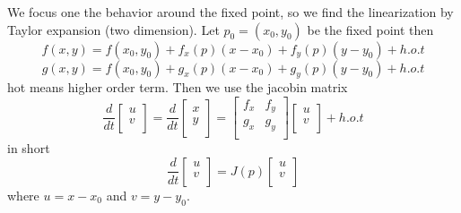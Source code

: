 \documentclass[9pt]{article}
\theoremstyle{definition}
\newcommand{\newmatrix}[2]{\left[
                            \begin{matrix}
                            	{#1}\\
                            	{#2}\\
                            \end{matrix}
                           \right]}
\newenvironment{changemargin}[2]{%
  \begin{list}{}{%
    \setlength{\topsep}{0pt}%
    \setlength{\leftmargin}{#1}%
    \setlength{\rightmargin}{#2}%
    \setlength{\listparindent}{\parindent}%
    \setlength{\itemindent}{\parindent}%
    \setlength{\parsep}{\parskip}%
  }%
  \item[]}{\end{list}}
\theoremstyle{theorem}
\theoremstyle{remark}
\theoremstyle{lemma}
\begin{document}
\begin{changemargin}{-0.125in}{0in}
\begin{enumerate}
\begin{enumerate}
        We focus one the behavior around the fixed point, so we find the linearization by Taylor expansion (two dimension). Let $p_0 = (x_0, y_0)$ be the fixed point then
        \[
        f(x,y) = f(x_0,y_0) + f_x(p)(x - x_0) + f_y(p)(y - y_0) + h.o.t
        \] 
        \[
        g(x,y) = f(x_0,y_0) + g_x(p)(x - x_0) + g_y(p)(y - y_0) + h.o.t
        \]
        hot means higher order term. Then we use the jacobin matrix 
        \[
        \frac{d}{dt} \left[
                           \begin{matrix}
                           	u\\
                           	v\\
                           \end{matrix}
                           \right] 
         = \frac{d}{dt} \left[
                           \begin{matrix}
                           	x\\
                            y\\
                           \end{matrix}
                        \right]
                        = \left[
                            \begin{matrix}
                            	f_x & f_y\\
                            	g_x & g_y\\
                            \end{matrix}
                          \right]
                          \newmatrix{u}{v} + h.o.t           
        \]
        in short
        \[
        \frac{d}{dt} \newmatrix{u}{v} = J(p)\newmatrix{u}{v}
        \]
        where $u = x - x_0$ and $v = y - y_0$.
        \end{enumerate}
 \end{enumerate} 
        
        
        
    
    
   


\end{changemargin}
\end{document}
